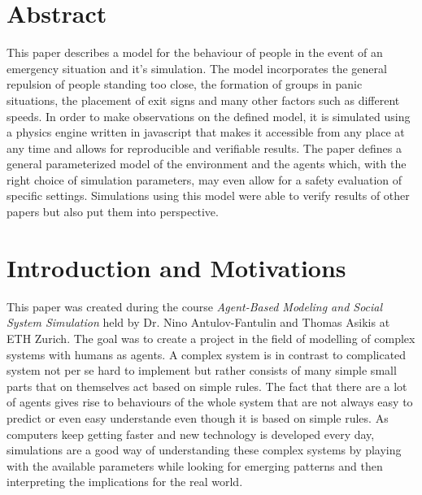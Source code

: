 \documentclass[11pt]{article}
\begin{document}






\tableofcontents

\newpage




\section{Abstract}

This paper describes a model for the behaviour of people in the event of an emergency situation and it's simulation. The model incorporates the general repulsion of people standing too close, the formation of groups in panic situations, the placement of exit signs and many other factors such as different speeds. In order to make observations on the defined model, it is simulated using a physics engine written in javascript that makes it accessible from any place at any time and allows for reproducible and verifiable results. The paper defines a general parameterized model of the environment and the agents which, with the right choice of simulation parameters, may even allow for a safety evaluation of specific settings. Simulations using this model were able to verify results of other papers but also put them into perspective.

\section{Introduction and Motivations}

This paper was created during the course \textit{Agent-Based Modeling and Social System Simulation} held by Dr. Nino Antulov-Fantulin and Thomas Asikis at ETH Zurich. The goal was to create a project in the field of modelling of complex systems with humans as agents. A complex system is in contrast to complicated system not per se hard to implement but rather consists of many simple small parts that on themselves act based on simple rules. The fact that there are a lot of agents gives rise to behaviours of the whole system that are not always easy to predict or even easy understande even though it is based on simple rules. As computers keep getting faster and new technology is developed every day, simulations are a good way of understanding these complex systems by playing with the available parameters while looking for emerging patterns and then interpreting the implications for the real world.
\end{document}
